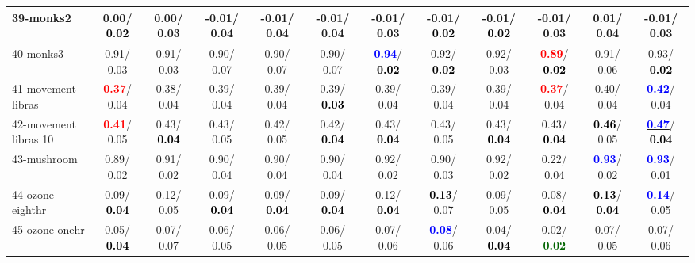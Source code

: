 \begin{table}[h]
\begin{center}
{\begin{tabular}{lc|c|c|c|c|c|c|c|c|c|c}
39-monks2 &   0.00/\textcolor{black}{\textbf{  0.02}} &   0.00/  0.03 &  -0.01/  0.04 &  -0.01/  0.04 &  -0.01/  0.04 &  -0.01/  0.03 &  -0.01/\textcolor{black}{\textbf{  0.02}} &  -0.01/\textcolor{black}{\textbf{  0.02}} &  -0.01/  0.03 &   0.01/  0.04 &  -0.01/  0.03 \\ \hline
40-monks3 &   0.91/  0.03 &   0.91/  0.03 &   0.90/  0.07 &   0.90/  0.07 &   0.90/  0.07 & \textcolor{blue}{\textbf{  0.94}}/\textcolor{black}{\textbf{  0.02}} &   0.92/\textcolor{black}{\textbf{  0.02}} &   0.92/  0.03 & \textcolor{red}{\textbf{  0.89}}/\textcolor{black}{\textbf{  0.02}} &   0.91/  0.06 &   0.93/\textcolor{black}{\textbf{  0.02}} \\
41-movement libras & \textcolor{red}{\textbf{  0.37}}/  0.04 &   0.38/  0.04 &   0.39/  0.04 &   0.39/  0.04 &   0.39/\textcolor{black}{\textbf{  0.03}} &   0.39/  0.04 &   0.39/  0.04 &   0.39/  0.04 & \textcolor{red}{\textbf{  0.37}}/  0.04 &   0.40/  0.04 & \textcolor{blue}{\textbf{  0.42}}/  0.04 \\
42-movement libras 10 & \textcolor{red}{\textbf{  0.41}}/  0.05 &   0.43/\textcolor{black}{\textbf{  0.04}} &   0.43/  0.05 &   0.42/  0.05 &   0.42/\textcolor{black}{\textbf{  0.04}} &   0.43/\textcolor{black}{\textbf{  0.04}} &   0.43/  0.05 &   0.43/\textcolor{black}{\textbf{  0.04}} &   0.43/\textcolor{black}{\textbf{  0.04}} & \textcolor{black}{\textbf{  0.46}}/  0.05 & \underline{\textcolor{blue}{\textbf{  0.47}}}/\textcolor{black}{\textbf{  0.04}} \\
43-mushroom &   0.89/  0.02 &   0.91/  0.02 &   0.90/  0.04 &   0.90/  0.04 &   0.90/  0.04 &   0.92/  0.02 &   0.90/  0.03 &   0.92/  0.02 &   0.22/  0.04 & \textcolor{blue}{\textbf{  0.93}}/  0.02 & \textcolor{blue}{\textbf{  0.93}}/  0.01 \\
44-ozone eighthr &   0.09/\textcolor{black}{\textbf{  0.04}} &   0.12/  0.05 &   0.09/\textcolor{black}{\textbf{  0.04}} &   0.09/\textcolor{black}{\textbf{  0.04}} &   0.09/\textcolor{black}{\textbf{  0.04}} &   0.12/\textcolor{black}{\textbf{  0.04}} & \textcolor{black}{\textbf{  0.13}}/  0.07 &   0.09/  0.05 &   0.08/\textcolor{black}{\textbf{  0.04}} & \textcolor{black}{\textbf{  0.13}}/\textcolor{black}{\textbf{  0.04}} & \underline{\textcolor{blue}{\textbf{  0.14}}}/  0.05 \\
45-ozone onehr &   0.05/\textcolor{black}{\textbf{  0.04}} &   0.07/  0.07 &   0.06/  0.05 &   0.06/  0.05 &   0.06/  0.05 &   0.07/  0.06 & \textcolor{blue}{\textbf{  0.08}}/  0.06 &   0.04/\textcolor{black}{\textbf{  0.04}} &   0.02/\textcolor{darkgreen}{\textbf{  0.02}} &   0.07/  0.05 &   0.07/  0.06 \\

\end{tabular}}
\end{center}
\end{table}
